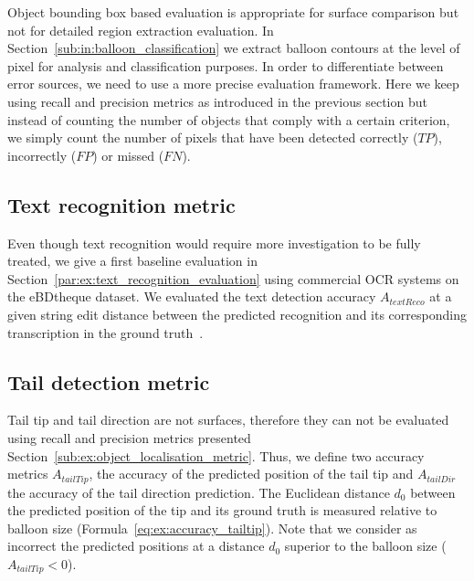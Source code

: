 Object bounding box based evaluation is appropriate for surface comparison but not for detailed region extraction evaluation.
In Section~\ref{sub:in:balloon_classification} we extract balloon contours at the level of pixel for analysis and classification purposes.
In order to differentiate between error sources, we need to use a more precise evaluation framework.
Here we keep using recall and precision metrics as introduced in the previous section but instead of counting the number of objects that comply with a certain criterion, we simply count the number of pixels that have been detected correctly ($TP$), incorrectly ($FP$) or missed ($FN$).


\subsection{Text recognition metric} %
\label{sub:ex:text_recognition_metric}
Even though text recognition would require more investigation to be fully treated, we give a first baseline evaluation in Section~\ref{par:ex:text_recognition_evaluation} using commercial OCR systems on the eBDtheque dataset.
We evaluated the text detection accuracy $A_{textReco}$ at a given string edit distance between the predicted recognition and its corresponding transcription in the ground truth~\cite{Guerin2013}.


\subsection{Tail detection metric} %
\label{sub:ex:tail_detection_metric}

Tail tip and tail direction are not surfaces, therefore they can not be evaluated using recall and precision metrics presented Section~\ref{sub:ex:object_localisation_metric}.
Thus, we define two accuracy metrics $A_{tailTip}$, the accuracy of the predicted position of the tail tip and $A_{tailDir}$ the accuracy of the tail direction prediction.
The Euclidean distance $d_0$ between the predicted position of the tip and its ground truth is measured relative to balloon size (Formula~\ref{eq:ex:accuracy_tailtip}).
Note that we consider as incorrect the predicted positions at a distance $d_0$ superior to the balloon size ($A_{tailTip} < 0$). 

